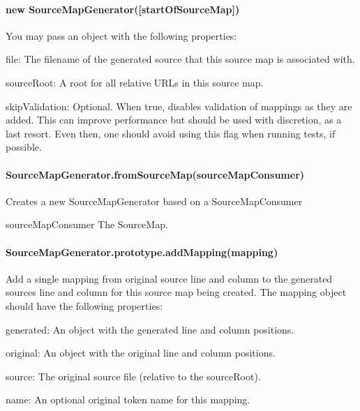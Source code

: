 \paragraph*{new Source\+Map\+Generator(\mbox{[}start\+Of\+Source\+Map\mbox{]})}

You may pass an object with the following properties\+:


\begin{DoxyItemize}
\item {\ttfamily file}\+: The filename of the generated source that this source map is associated with.
\item {\ttfamily source\+Root}\+: A root for all relative U\+R\+Ls in this source map.
\item {\ttfamily skip\+Validation}\+: Optional. When {\ttfamily true}, disables validation of mappings as they are added. This can improve performance but should be used with discretion, as a last resort. Even then, one should avoid using this flag when running tests, if possible.
\end{DoxyItemize}

\paragraph*{Source\+Map\+Generator.\+from\+Source\+Map(source\+Map\+Consumer)}

Creates a new Source\+Map\+Generator based on a Source\+Map\+Consumer


\begin{DoxyItemize}
\item {\ttfamily source\+Map\+Consumer} The Source\+Map.
\end{DoxyItemize}

\paragraph*{Source\+Map\+Generator.\+prototype.\+add\+Mapping(mapping)}

Add a single mapping from original source line and column to the generated source\textquotesingle{}s line and column for this source map being created. The mapping object should have the following properties\+:


\begin{DoxyItemize}
\item {\ttfamily generated}\+: An object with the generated line and column positions.
\item {\ttfamily original}\+: An object with the original line and column positions.
\item {\ttfamily source}\+: The original source file (relative to the source\+Root).
\item {\ttfamily name}\+: An optional original token name for this mapping.
\end{DoxyItemize}

